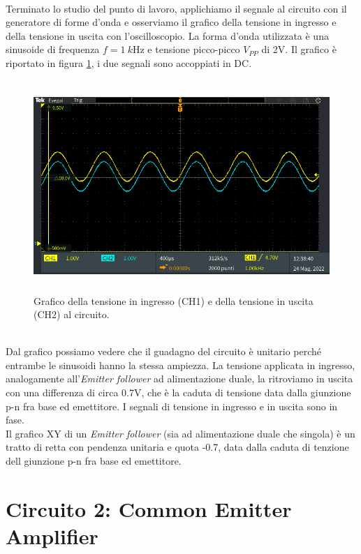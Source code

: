 \documentclass{report}
\begin{document}
\\Terminato lo studio del punto di lavoro, applichiamo il segnale al circuito con il generatore di forme d'onda e osserviamo il grafico della tensione in ingresso e della tensione in uscita con l'oscilloscopio. La forma d'onda utilizzata è una sinusoide di frequenza $f=\SI{1}{k\hertz}$ e tensione picco-picco $V_{PP}$ di 2V. Il grafico è riportato in figura \ref{figura:oscillo3}, i due segnali sono accoppiati in DC.
\begin{figure}[h]
\centering
\includegraphics[height=8cm]{immagini/oscillo3}
\caption{Grafico della tensione in ingresso (CH1) e della tensione in uscita (CH2) al circuito.}
\label{figura:oscillo3}
\end{figure}
\\Dal grafico possiamo vedere che il guadagno del circuito è unitario perché entrambe le sinusoidi hanno la stessa ampiezza. La tensione applicata in ingresso, analogamente all'\textit{Emitter follower} ad alimentazione duale, la ritroviamo in uscita con una differenza di circa 0.7V, che è la caduta di tensione data dalla giunzione p-n fra base ed emettitore. I segnali di tensione in ingresso e in uscita sono in fase. 
\\\indent Il grafico XY di un \textit{Emitter follower} (sia ad alimentazione duale che singola) è un tratto di retta con pendenza unitaria e quota -0.7, data dalla caduta di tenzione dell giunzione p-n fra base ed emettitore.
\clearpage
\newpage
\chapter{Circuito 2: Common Emitter Amplifier}
\end{document}
